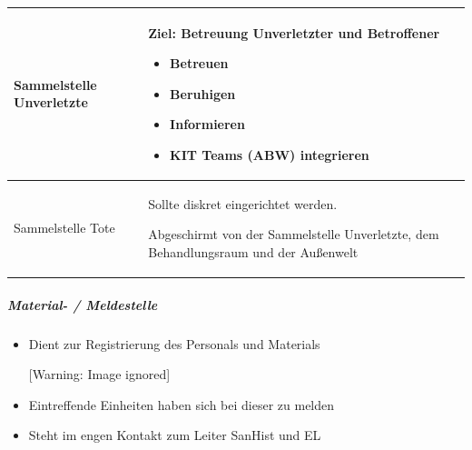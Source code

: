 \documentclass{article}
\begin{document}
\begin{center}
\tablehead{}\begin{supertabular}{|m{4.367cm}m{4.367cm}m{4.367cm}|}
\hline
{\mdseries\color{black} Sammelstelle Unverletzte}

{%
 \par}

 &
{\mdseries Ziel: Betreuung Unverletzter und Betroffener}

\begin{itemize}
\item {\mdseries Betreuen}

\item {\mdseries Beruhigen}

\item {\mdseries Informieren}

\item {\mdseries KIT Teams (ABW) integrieren}

\end{itemize}
 &
{%
 \par}

\\\hline
{\mdseries\color{black} Sammelstelle Tote}

 &
{\mdseries Sollte diskret eingerichtet werden.}

{\mdseries Abgeschirmt von der Sammel\-stelle Unverletzte, dem
Be\-handlungs\-raum und der Au{\ss}en\-welt}

 &
{%
 \par}

\\\hline
\end{supertabular}
\end{center}
\subparagraph{Material- / Meldestelle}
\begin{itemize}
\item {\mdseries
Dient zur Registrierung des Personals und Materials}

\begin{center}
 [Warning: Image ignored] %

\end{center}
\item {\mdseries
Eintreffende Einheiten haben sich bei dieser zu melden}

\item {\mdseries
Steht im engen Kontakt zum Leiter SanHist und EL  }

\end{itemize}
\end{document}
